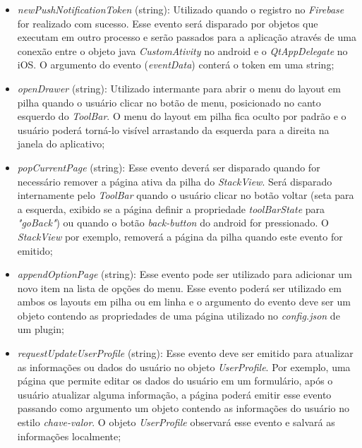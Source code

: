 \begin{itemize}
\begin{itemize}
		\item \textit{newPushNotificationToken} (string): Utilizado quando o registro no \textit{Firebase} for realizado com sucesso. Esse evento será disparado por objetos que executam em outro processo e serão passados para a aplicação através de uma conexão entre o objeto java \textit{CustomAtivity} no android e o \textit{QtAppDelegate} no iOS. O argumento do evento (\textit{eventData}) conterá o token em uma string;

		\item \textit{openDrawer} (string): Utilizado intermante para abrir o menu do layout em pilha quando o usuário clicar no botão de menu, posicionado no canto esquerdo do \textit{ToolBar}. O menu do layout em pilha fica oculto por padrão e o usuário poderá torná-lo visível arrastando da esquerda para a direita na janela do aplicativo;

		\item \textit{popCurrentPage} (string): Esse evento deverá ser disparado quando for necessário remover a página ativa da pilha do \textit{StackView}. Será disparado internamente pelo \textit{ToolBar} quando o usuário clicar no botão voltar (seta para a esquerda, exibido se a página definir a propriedade \textit{toolBarState} para \textit{"goBack"}) ou quando o botão \textit{back-button} do android for pressionado. O \textit{StackView} por exemplo, removerá a página da pilha quando este evento for emitido;

		\item \textit{appendOptionPage} (string): Esse evento pode ser utilizado para adicionar um novo item na lista de opções do menu. Esse evento poderá ser utilizado em ambos os layouts em pilha ou em linha e o argumento do evento deve ser um objeto contendo as propriedades de uma página utilizado no \textit{config.json} de um plugin;

		\item \textit{requestUpdateUserProfile} (string): Esse evento deve ser emitido para atualizar as informações ou dados do usuário no objeto \textit{UserProfile}. Por exemplo, uma página que permite editar os dados do usuário em um formulário, após o usuário atualizar alguma informação, a página poderá emitir esse evento passando como argumento um objeto contendo as informações do usuário no estilo \textit{chave-valor}. O objeto \textit{UserProfile} observará esse evento e salvará as informações localmente;


\end{itemize}
\end{itemize}
